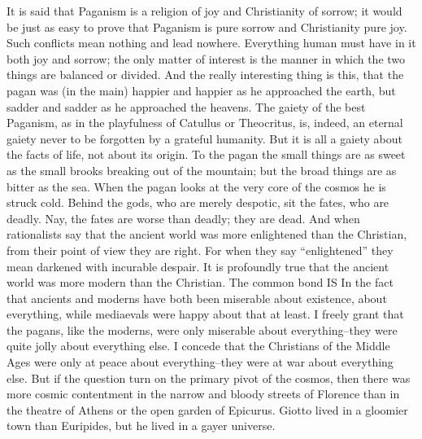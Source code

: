 \documentclass{book}
\begin{document}
It is said that Paganism is a religion of joy and Christianity of sorrow; it would be just as easy to prove that Paganism is pure sorrow and Christianity pure joy. Such conflicts mean nothing and lead nowhere. Everything human must have in it both joy and sorrow; the only matter of interest is the manner in which the two things are balanced or divided. And the really interesting thing is this, that the pagan was (in the main) happier and happier as he approached the earth, but sadder and sadder as he approached the heavens. The gaiety of the best Paganism, as in the playfulness of Catullus or Theocritus, is, indeed, an eternal gaiety never to be forgotten by a grateful humanity. But it is all a gaiety about the facts of life, not about its origin. To the pagan the small things are as sweet as the small brooks breaking out of the mountain; but the broad things are as bitter as the sea. When the pagan looks at the very core of the cosmos he is struck cold. Behind the gods, who are merely despotic, sit the fates, who are deadly. Nay, the fates are worse than deadly; they are dead. And when rationalists say that the ancient world was more enlightened than the Christian, from their point of view they are right. For when they say “enlightened” they mean darkened with incurable despair. It is profoundly true that the ancient world was more modern than the Christian. The common bond IS In the fact that ancients and moderns have both been miserable about existence, about everything, while mediaevals were happy about that at least. I freely grant that the pagans, like the moderns, were only miserable about everything–they were quite jolly about everything else. I concede that the Christians of the Middle Ages were only at peace about everything–they were at war about everything else. But if the question turn on the primary pivot of the cosmos, then there was more cosmic contentment in the narrow and bloody streets of Florence than in the theatre of Athens or the open garden of Epicurus. Giotto lived in a gloomier town than Euripides, but he lived in a gayer universe.
\end{document}
